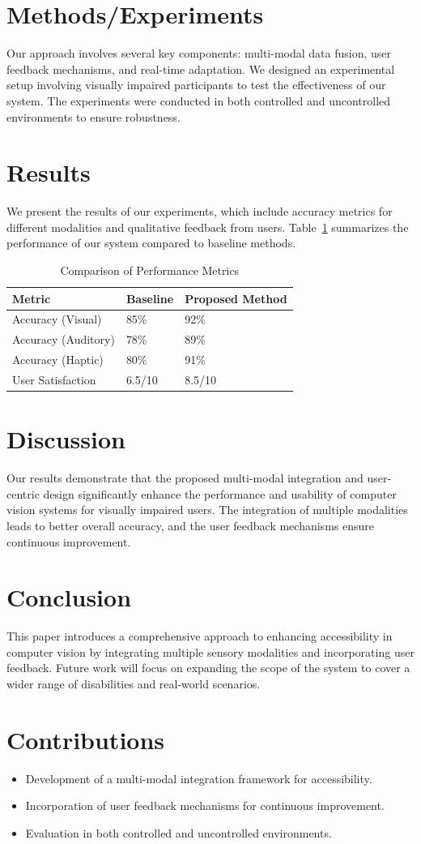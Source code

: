 \documentclass{article}
\begin{document}
\section{Methods/Experiments}
Our approach involves several key components: multi-modal data fusion, user feedback mechanisms, and real-time adaptation. We designed an experimental setup involving visually impaired participants to test the effectiveness of our system. The experiments were conducted in both controlled and uncontrolled environments to ensure robustness.

\section{Results}
\label{sec:results}
We present the results of our experiments, which include accuracy metrics for different modalities and qualitative feedback from users. Table~\ref{tab:results} summarizes the performance of our system compared to baseline methods.

\begin{table}[ht]
\centering
\caption{Comparison of Performance Metrics}
\label{tab:results}
\begin{tabularx}{\textwidth}{|X|X|X|}
\hline
\textbf{Metric} & \textbf{Baseline} & \textbf{Proposed Method} \\ \hline
Accuracy (Visual) & 85\% & 92\% \\ \hline
Accuracy (Auditory) & 78\% & 89\% \\ \hline
Accuracy (Haptic) & 80\% & 91\% \\ \hline
User Satisfaction & 6.5/10 & 8.5/10 \\ \hline
\end{tabularx}
\end{table}

\section{Discussion}
Our results demonstrate that the proposed multi-modal integration and user-centric design significantly enhance the performance and usability of computer vision systems for visually impaired users. The integration of multiple modalities leads to better overall accuracy, and the user feedback mechanisms ensure continuous improvement.

\section{Conclusion}
This paper introduces a comprehensive approach to enhancing accessibility in computer vision by integrating multiple sensory modalities and incorporating user feedback. Future work will focus on expanding the scope of the system to cover a wider range of disabilities and real-world scenarios.

\section{Contributions}
\begin{itemize}
\item Development of a multi-modal integration framework for accessibility.
\item Incorporation of user feedback mechanisms for continuous improvement.
\item Evaluation in both controlled and uncontrolled environments.
\end{itemize}
\end{document}
